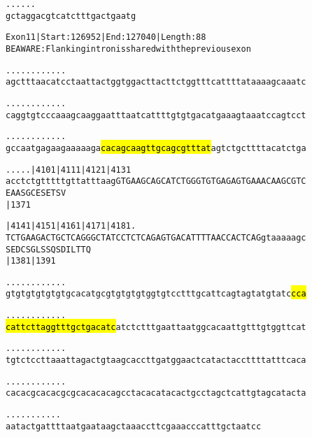 \documentclass{article}
\begin{document}
\newpage
\begin{alltt}
.    .    .    .    .    .
gctaggacgtcatctttgactgaatg
\end{alltt}
\newpage
\begin{alltt}
Exon 11 | Start: 126952 | End: 127040 | Length: 88
BE AWARE: Flanking intron is shared with the previous exon

.    .    .    .    .    .    .    .    .    .    .    .    
agctttaacatcctaattactggtggacttacttctggtttcattttataaaagcaaatc

.    .    .    .    .    .    .    .    .    .    .    .    
caggtgtcccaaagcaaggaatttaatcattttgtgtgacatgaaagtaaatccagtcct

.    .    .    .    .    .    .    .    .    .    .    .    
gccaatgagaagaaaaaga\hl{cacagcaagttgcagcgtttat}agtctgcttttacatctga

.    .    .    .    .     |4101     |4111     |4121     |4131
acctctgtttttgttatttaagGTGAAGCAGCATCTGGGTGTGAGAGTGAAACAAGCGTC
                        E  A  A  S  G  C  E  S  E  T  S  V  
                                    |1371                   

      |4141     |4151     |4161     |4171     |4181    .    
TCTGAAGACTGCTCAGGGCTATCCTCTCAGAGTGACATTTTAACCACTCAGgtaaaaagc
S  E  D  C  S  G  L  S  S  Q  S  D  I  L  T  T  Q           
      |1381                         |1391                   

.    .    .    .    .    .    .    .    .    .    .    .    
gtgtgtgtgtgtgcacatgcgtgtgtgtggtgtcctttgcattcagtagtatgtatc\hl{cca}

.    .    .    .    .    .    .    .    .    .    .    .    
\hl{cattcttaggtttgctgacatc}atctctttgaattaatggcacaattgtttgtggttcat

.    .    .    .    .    .    .    .    .    .    .    .    
tgtctccttaaattagactgtaagcaccttgatggaactcatactaccttttatttcaca

.    .    .    .    .    .    .    .    .    .    .    .    
cacacgcacacgcgcacacacagcctacacatacactgcctagctcattgtagcatacta

.    .    .    .    .    .    .    .    .    .    .
aatactgattttaatgaataagctaaaccttcgaaacccatttgctaatcc
\end{alltt}
\newpage
\end{document}
